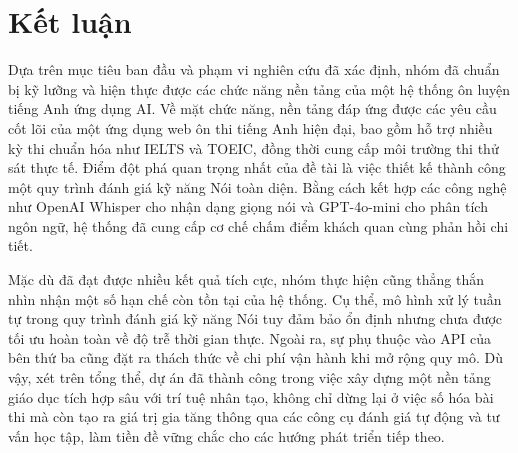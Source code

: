\chapter{Kết luận}

Dựa trên mục tiêu ban đầu và phạm vi nghiên cứu đã xác định, nhóm đã chuẩn bị kỹ lưỡng và hiện thực được các chức năng nền tảng của một hệ thống ôn luyện tiếng Anh ứng dụng AI. Về mặt chức năng, nền tảng đáp ứng được các yêu cầu cốt lõi của một ứng dụng web ôn thi tiếng Anh hiện đại, bao gồm hỗ trợ nhiều kỳ thi chuẩn hóa như IELTS và TOEIC, đồng thời cung cấp môi trường thi thử sát thực tế. Điểm đột phá quan trọng nhất của đề tài là việc thiết kế thành công một quy trình đánh giá kỹ năng Nói toàn diện. Bằng cách kết hợp các công nghệ như OpenAI Whisper cho nhận dạng giọng nói và GPT-4o-mini cho phân tích ngôn ngữ, hệ thống đã cung cấp cơ chế chấm điểm khách quan cùng phản hồi chi tiết.

Mặc dù đã đạt được nhiều kết quả tích cực, nhóm thực hiện cũng thẳng thắn nhìn nhận một số hạn chế còn tồn tại của hệ thống. Cụ thể, mô hình xử lý tuần tự trong quy trình đánh giá kỹ năng Nói tuy đảm bảo ổn định nhưng chưa được tối ưu hoàn toàn về độ trễ thời gian thực. Ngoài ra, sự phụ thuộc vào API của bên thứ ba cũng đặt ra thách thức về chi phí vận hành khi mở rộng quy mô. Dù vậy, xét trên tổng thể, dự án đã thành công trong việc xây dựng một nền tảng giáo dục tích hợp sâu với trí tuệ nhân tạo, không chỉ dừng lại ở việc số hóa bài thi mà còn tạo ra giá trị gia tăng thông qua các công cụ đánh giá tự động và tư vấn học tập, làm tiền đề vững chắc cho các hướng phát triển tiếp theo.